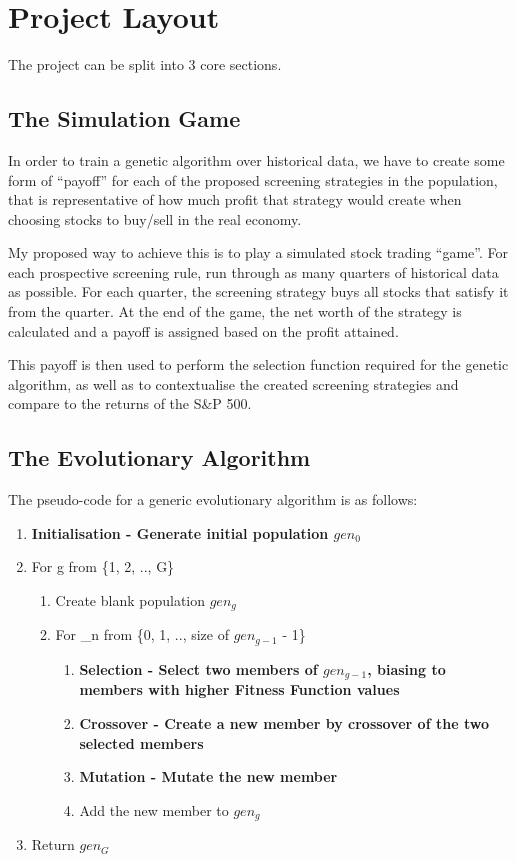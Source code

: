 \section{Project Layout}
The project can be split into 3 core sections.

\subsection{The Simulation Game} \label{simGameProp}
In order to train a genetic algorithm over historical data, we have to create some form of “payoff” for each of the proposed screening strategies in the population, that is representative of how much profit that strategy would create when choosing stocks to buy/sell in the real economy. \newline

My proposed way to achieve this is to play a simulated stock trading “game”. For each prospective screening rule, run through as many quarters of historical data as possible. For each quarter, the screening strategy buys all stocks that satisfy it from the quarter. At the end of the game, the net worth of the strategy is calculated and a payoff is assigned based on the profit attained. \newline

This payoff is then used to perform the selection function required for the genetic algorithm, as well as to contextualise the created screening strategies and compare to the returns of the S\&P 500.

\subsection{The Evolutionary Algorithm} \label{evoAlgoProp}
The pseudo-code for a generic evolutionary algorithm is as follows:
\begin{enumerate}
    \item \bf Initialisation \rm - Generate initial population $gen_{0}$ \vspace{-2mm}
    \item For g from \{1, 2, .., G\}
    \begin{enumerate}
        \item Create blank population $gen_{g}$
        \item For \_n from \{0, 1, .., size of $gen_{g-1}$ - 1\}
        \begin{enumerate}
            \item \bf Selection \rm - Select two members of $gen_{g-1}$, biasing to members with higher \bf Fitness Function \rm values
            \item \bf Crossover \rm - Create a new member by crossover of the two selected members
            \item \bf Mutation \rm - Mutate the new member
            \item Add the new member to $gen_{g}$
        \end{enumerate}
    \end{enumerate} \vspace{-2mm}
    \item Return $gen_{G}$
\end{enumerate}

